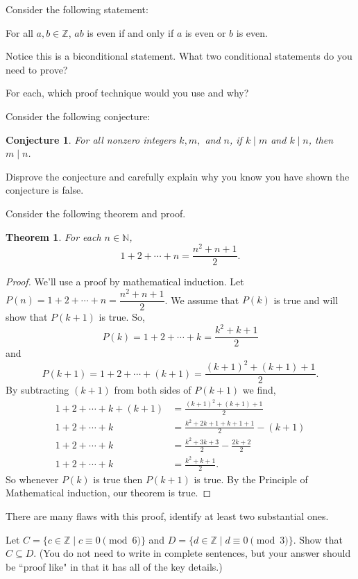 \documentclass[11pt]{exam}
\newtheorem*{thm}{Theorem}
\newtheorem*{conjecture}{Conjecture}
\newcommand{\Z}{\mathbb{Z}}
\newcommand{\N}{\mathbb{N}}
\begin{document}
\begin{questions}
\question[10] Consider the following statement:
\begin{center}
For all $a,b\in\Z$, $ab$ is even if and only if $a$ is even or $b$ is even.
\end{center}
Notice this is a biconditional statement. What two conditional statements do you need to prove?
\vfill

For each, which proof technique would you use and why?
\vfill


\newpage


\question[10] Consider the following conjecture:\begin{conjecture}
	For all nonzero integers $k, m,$ and $n$, if $k\mid m$ and $k\mid n$, then $m\mid n$.
	\end{conjecture}
Disprove the conjecture and carefully explain why you know you have shown the conjecture is false.
\vfill


\question[10]  Consider the following theorem and proof. 
\begin{thm}
For each $n\in \N$, 
\[1+2+\cdots + n = \frac{n^2+n+1}{2}.\]
\end{thm}
\begin{proof}
We'll use a proof by mathematical induction. Let $P(n) = 1+2+\cdots + n = \dfrac{n^2+n+1}{2}$. We assume that $P(k)$ is true and will show that $P(k+1)$ is true. So,
\[P(k) = 1+2 + \cdots + k = \frac{k^2+k+1}{2}\]
and
\[P(k+1) = 1+2+\cdots + (k+1) = \frac{(k+1)^2 + (k+1) + 1}{2}.\]
By subtracting $(k+1)$ from both sides of $P(k+1)$ we find,
	\begin{align*}
	1+ 2 + \cdots + k + (k+1)&= \frac{(k+1)^2 + (k+1) + 1}{2}\\
	1+2 + \cdots + k &= \frac{k^2+2k+1+k+1+1}{2} - (k+1)\\
	1+2+\cdots + k &= \frac{k^2+3k+3}{2} - \frac{2k+2}{2}\\
	1+2 + \cdots + k & = \frac{k^2+k+1}{2}.
	\end{align*}
So whenever $P(k)$ is true then $P(k+1)$ is true. By the Principle of Mathematical induction, our theorem is true.
\end{proof}

There are many flaws with this proof, identify at least two substantial ones.
\vfill

\newpage

\question[10] Let $C = \{c\in \Z \mid c\equiv 0 \pmod{6}\}$ and $D = \{d\in \Z \mid d\equiv 0\pmod{3}\}$. Show that $C\subseteq D$.  (You do not need to write in complete sentences, but your answer should be ``proof like" in that it has all of the key details.)
\vfill


\end{questions}
\end{document}
